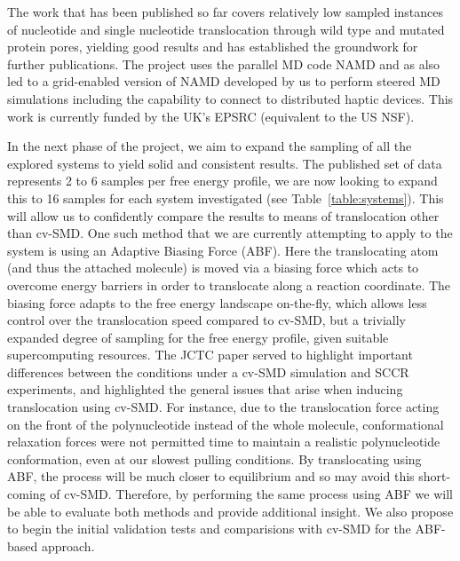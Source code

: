 \documentclass[a4paper,10pt]{article}
\begin{document}

The work that has been published so far covers relatively low sampled instances of nucleotide and single nucleotide translocation through wild type and mutated protein pores, yielding good results and has established the groundwork for further publications. The project uses the parallel MD code NAMD and as also led to a grid-enabled version of NAMD developed by us to perform steered MD simulations including the capability to connect to distributed haptic devices. This work is currently funded by the UK's EPSRC (equivalent to the US NSF). %

In the next phase of the project, we aim to expand the sampling of all the explored systems to yield solid and consistent results. The published set of data represents 2 to 6 samples per free energy profile, we are now looking to expand this to 16 samples for each system investigated (see Table~\ref{table:systems}). This will allow us to confidently compare the results to means of translocation other than cv-SMD. One such method that we are currently attempting to apply to the system is using an Adaptive Biasing Force (ABF). Here the translocating atom (and thus the attached molecule) is moved via a biasing force which acts to overcome energy barriers in order to translocate along a reaction coordinate. The biasing force adapts to the free energy landscape on-the-fly, which allows less control over the translocation speed compared to cv-SMD, but a trivially expanded degree of sampling for the free energy profile, given suitable supercomputing resources. The JCTC paper served to highlight important differences between the conditions under a cv-SMD simulation and SCCR experiments, and highlighted the general issues that arise when inducing translocation using cv-SMD. For instance, due to the translocation force acting on the front of the polynucleotide instead of the whole molecule, conformational relaxation forces were not permitted time to maintain a realistic polynucleotide conformation, even at our slowest pulling conditions. By translocating using ABF, the process will be much closer to equilibrium and so may avoid this short-coming of cv-SMD. Therefore, by performing the same process using ABF we will be able to evaluate both methods and provide additional insight. We also propose to begin the initial validation tests and comparisions with cv-SMD for the ABF-based approach.
\end{document}
